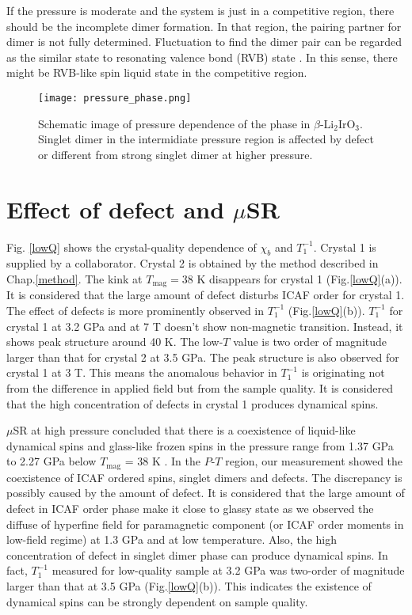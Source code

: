 \documentclass[a4,10.5pt]{report}
\begin{document}
If the pressure is moderate and the system is just in a competitive region, there should be the incomplete dimer formation.
In that region, the pairing partner for dimer is not fully determined.
Fluctuation to find the dimer pair can be regarded as the similar state to resonating valence bond (RVB) state \cite{ANDERSON1973153}.
In this sense, there might be RVB-like spin liquid state in the competitive region.

\begin{figure}[H]
  \centering
  \texttt{[image: pressure\_phase.png]}
  \caption{Schematic image of pressure dependence of the phase in $\beta$-Li$_2$IrO$_3$.
  Singlet dimer in the intermidiate pressure region is affected by defect or different from strong singlet dimer at higher pressure.}
  \label{pressure_phase}
\end{figure}

\section{Effect of defect and $\mu$SR}
Fig. \ref{lowQ} shows the crystal-quality dependence of $\chi_b$ and $T^{-1}_1$.
Crystal 1 is supplied by a collaborator.
Crystal 2 is obtained by the method described in Chap.\ref{method}.
The kink at $T_\mathrm{mag} = 38$ K disappears for crystal 1 (Fig.\ref{lowQ}(a)).
It is considered that the large amount of defect disturbs ICAF order for crystal 1.
The effect of defects is more prominently observed in $T^{-1}_1$ (Fig.\ref{lowQ}(b)).
$T^{-1}_1$ for crystal 1 at 3.2 GPa and at 7 T doesn't show non-magnetic transition.
Instead, it shows peak structure around 40 K.
The low-$T$ value is two order of magnitude larger than that for crystal 2 at 3.5 GPa.
The peak structure is also observed for crystal 1 at 3 T. 
This means the anomalous behavior in $T^{-1}_1$ is originating not from the difference in applied field but from the sample quality.
It is considered that the high concentration of defects in crystal 1 produces dynamical spins.

$\mu$SR at high pressure concluded that there is a coexistence of liquid-like dynamical spins and glass-like frozen spins 
in the pressure range from 1.37 GPa to 2.27 GPa below $T_{\mathrm{mag}}$ = 38 K \cite{Majumder2018}. 
In the $P$-$T$ region, our measurement showed the coexistence of ICAF ordered spins, singlet dimers and defects. 
The discrepancy is possibly caused by the amount of defect. 
It is considered that the large amount of defect in ICAF order phase make it close to glassy state
as we observed the diffuse of hyperfine field for paramagnetic component (or ICAF order moments in low-field regime) at 1.3 GPa and at low temperature.
Also, the high concentration of defect in singlet dimer phase can produce dynamical spins.
In fact, $T^{-1}_1$ measured for low-quality sample at 3.2 GPa was two-order of magnitude larger than that at 3.5 GPa (Fig.\ref{lowQ}(b)). 
This indicates the existence of dynamical spins can be strongly dependent on sample quality. 
\end{document}
